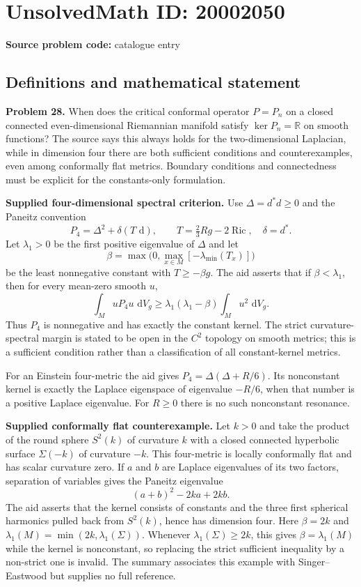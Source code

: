 \documentclass[11pt]{article}
\newcommand{\R}{\mathbb{R}}
\newcommand{\dd}{\,\mathrm{d}}
\begin{document}
\section*{UnsolvedMath ID: 20002050}
\textbf{Source problem code:} catalogue entry
\subsection{Definitions and mathematical statement}
\textbf{Problem 28.} When does the critical conformal operator $P=P_n$ on a closed connected even-dimensional Riemannian manifold satisfy $\ker P_n=\R$ on smooth functions? The source says this always holds for the two-dimensional Laplacian, while in dimension four there are both sufficient conditions and counterexamples, even among conformally flat metrics. Boundary conditions and connectedness must be explicit for the constants-only formulation.

\textbf{Supplied four-dimensional spectral criterion.} Use $\Delta=d^*d\ge0$ and the Paneitz convention
\[
 P_4=\Delta^2+\delta(T\,\dd),\qquad
 T=\tfrac23Rg-2\operatorname{Ric},\quad\delta=d^*.
\]
Let $\lambda_1>0$ be the first positive eigenvalue of $\Delta$ and let
\[
 \beta=\max\bigl(0,\max_{x\in M}[-\lambda_{\min}(T_x)]\bigr)
\]
be the least nonnegative constant with $T\ge-\beta g$. The aid asserts that if $\beta<\lambda_1$, then for every mean-zero smooth $u$,
\[
 \int_MuP_4u\,\dd V_g
 \ge\lambda_1(\lambda_1-\beta)\int_Mu^2\,\dd V_g.
\]
Thus $P_4$ is nonnegative and has exactly the constant kernel. The strict curvature-spectral margin is stated to be open in the $C^2$ topology on smooth metrics; this is a sufficient condition rather than a classification of all constant-kernel metrics.

For an Einstein four-metric the aid gives $P_4=\Delta(\Delta+R/6)$. Its nonconstant kernel is exactly the Laplace eigenspace of eigenvalue $-R/6$, when that number is a positive Laplace eigenvalue. For $R\ge0$ there is no such nonconstant resonance.

\textbf{Supplied conformally flat counterexample.} Let $k>0$ and take the product of the round sphere $S^2(k)$ of curvature $k$ with a closed connected hyperbolic surface $\Sigma(-k)$ of curvature $-k$. This four-metric is locally conformally flat and has scalar curvature zero. If $a$ and $b$ are Laplace eigenvalues of its two factors, separation of variables gives the Paneitz eigenvalue
\[
 (a+b)^2-2ka+2kb.
\]
The aid asserts that the kernel consists of constants and the three first spherical harmonics pulled back from $S^2(k)$, hence has dimension four. Here $\beta=2k$ and $\lambda_1(M)=\min(2k,\lambda_1(\Sigma))$. Whenever $\lambda_1(\Sigma)\ge2k$, this gives $\beta=\lambda_1(M)$ while the kernel is nonconstant, so replacing the strict sufficient inequality by a non-strict one is invalid. The summary associates this example with Singer--Eastwood but supplies no full reference.
\end{document}

